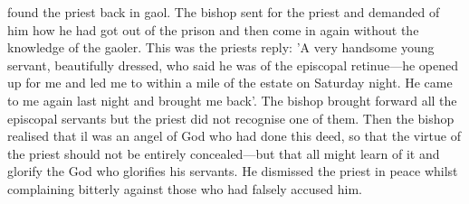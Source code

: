 found the priest back in gaol. The bishop sent for the priest and
demanded of him how he had got out of the prison and then come
in again without the knowledge of the gaoler. This was the priest\textquotesingle s
reply: 'A very handsome young servant, beautifully dressed, who
said he was of the episcopal retinue—he opened up for me and led
me to within a mile of the estate on Saturday night. He came to me
again last night and brought me back'. The bishop brought forward
all the episcopal servants but the priest did not recognise one of
them. Then the bishop realised that il was an angel of God who had
done this deed, so that the virtue of the priest should not be entirely
concealed—but that all might learn of it and glorify the God who
glorifies his servants. He dismissed the priest in peace whilst
complaining bitterly against those who had falsely accused him.

